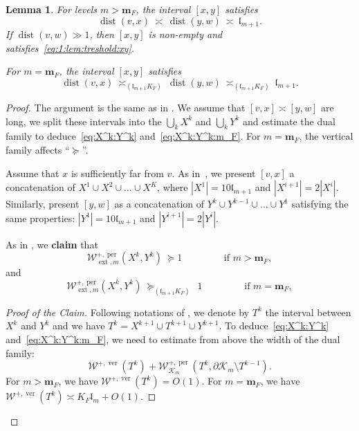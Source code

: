 \documentclass{amsart}
\newcommand{\1}{{\mathbb 1 }}
\newcommand{\ext}{{\operatorname{ext}}}
\newcommand{\Width}{{\mathcal W}}
\newcommand{\bbm}{{\mathbf m}}
\newcommand{\length}{{\mathfrak l}}
\newcommand\ver{{\operatorname{ver}}}
\newcommand\per{{\operatorname{per}}}
\newtheorem{lem}[thm]{Lemma}
\theoremstyle{remark}
\numberwithin{equation}{section}
\theoremstyle{definition}
\newcommand{\filled}{{\mathcal {K} }}
\newcommand{\dist}{\operatorname{dist}}
\begin{document}
\begin{lem}\label{lem:treshold:xy}
  For levels $m>\bbm_F$, the interval $[x,y]$ satisfies
  \begin{equation}
    \label{eq:1:lem:treshold:xy}
  \dist(v,x)\ \asymp \ \dist(y,w) \ \asymp \ \length_{m+1}.
  \end{equation}
If $\dist(v,w)\gg 1$, then $[x,y]$ is non-empty and satisfies~\eqref{eq:1:lem:treshold:xy}. 

  
  For $m=\bbm_F$, the interval  $[x,y]$ satisfies 
   \begin{equation}
    \label{eq:2:lem:treshold:xy}\dist(v,x)\ \asymp_{(\length_{m+1}K_F)} \ \dist(y,w) \  \asymp_{(\length_{m+1}K_F)} \ \length_{m+1}.
    \end{equation}
\end{lem}
\begin{proof} The argument is the same as in  \cite[\S 10.2]{DL22}. We assume that $[v,x]\asymp [y,w]$ are long, we split these intervals into the $\bigcup_k X^k$ and $\bigcup_k Y^k$ and estimate the dual family to deduce~\eqref{eq:X^k:Y^k} and~\eqref{eq:X^k:Y^k:m_F}. For $m=\bbm_F$, the vertical family affects ``$\succeq$''.

Assume that $x$ is sufficiently far from $v$. As in~\cite[\S 10.2]{DL22}, we present $[v,x]$ a concatenation of $X^1 \cup X^2\cup \dots \cup X^K$, where $|X^1|= 10 \length_{m+1}$ and $|X^{i+1}|=2|X^{i}|$. Similarly, present $[y,w]$ as a concatenation of $Y^k\cup Y^{k-1}\cup \dots \cup Y^1$ satisfying the same properties: $|Y^1|= 10 \length_{m+1}$ and $|Y^{i+1}|=2|Y^{i}|$. 

As in \cite[Lemma 10.5]{DL22}, we {\bf claim} that 
\begin{equation}
    \label{eq:X^k:Y^k}\Width^{+,\per}_{\ext, m}(X^k, Y^k)\ \succeq 1\qquad \qquad\text{ if }m>\bbm_F,
\end{equation}
and 
\begin{equation}
    \label{eq:X^k:Y^k:m_F}\Width^{+,\per}_{\ext, m}(X^k, Y^k)\ \succeq_{(\length_{m+1}K_F)}\ \  1\qquad \qquad\text{ if }m=\bbm_F,
\end{equation}
\begin{proof}[Proof of the Claim] Following notations of \cite[Lemma 10.5]{DL22}, we denote by $T^{k}$ the interval between $X^k$ and $Y^k$ and we have $T^{k}=X^{k+1}\cup T^{k+1}\cup Y^{k+1}$. To deduce~\eqref{eq:X^k:Y^k} and~\eqref{eq:X^k:Y^k:m_F}, we need to estimate from above the width of the dual family:
\[\Width^{+,\ver}(T^k)+\Width^{+,\per}_{\filled_{m}}(T^k,\partial \filled_{m}\setminus T^{k-1}).\]
For $m>\bbm_F$, we have $\Width^{+,\ver}(T^k)=O(1)$. For $m=\bbm_F$, we have $\Width^{+,\ver}(T^k)\asymp K_F\length_m+ O(1)$.


\end{proof}
\end{proof}
\end{document}
